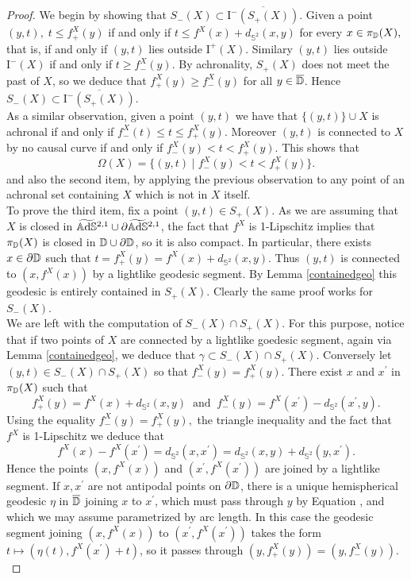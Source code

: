 \begin{proof}
    We begin by showing that $S_-(X)\subset \overline{\text{I}^-(S_+(X))}$. Given a point $(y,t),\;t\leq f_+^X(y)$ if and only if $t\leq f^X(x)+d_{\mathbb{S}^2}(x,y)$ for every $x\in\pi_{\mathbb{D}}(X),$ that is, if and only if $(y,t)$ lies outside $\text{I}^+(X)$. Similary $(y,t)$ lies outside $\text{I}^-(X)$ if and only if $t\geq f_-^X(y).$ By achronality, $S_+(X)$ does not meet the past of $X$, so we deduce that $f_+^X(y)\geq f_-^X(y)$ for all $y\in\overline{\mathbb{D}}$. Hence $S_-(X)\subset \overline{\text{I}^-(S_+(X))}$.\\
    As a similar observation, given a point $(y,t)$ we have that $\{(y,t)\}\cup X$ is achronal if and only if $f_-^X(t)\leq t\leq f_+^X(y)$. Moreover $(y,t)$ is connected to $X$ by no causal curve if and only if $f_-^X(y)<t<f_+^X(y)$. This shows that 
    \[
        \Omega(X)=\{(y,t)\;|\;f_-^X(y)<t<f_+^X(y)\}.
    \]
    and also the second item, by applying the previous observation to any point of an achronal set containing $X$ which is not in $X$ itself. \\
    To prove the third item, fix a point $(y,t)\in S_+(X)$. As we are assuming that $X$ is closed in $\widetilde{\mathbb{A}\mathrm{d}\mathbb{S}}{}^{2,1}\cup\partial\widetilde{\mathbb{A}\mathrm{d}\mathbb{S}}{}^{2,1}$, the fact that $f^X$ is 1-Lipschitz implies that $\pi_{\mathbb{D}}(X)$ is closed in $\mathbb{D}\cup\partial\mathbb{D}$, so it is also compact. In particular, there exists $x\in\partial\mathbb{D}$ such that $t=f_+^X(y)=f^X(x)+d_{\mathbb{S}^2}(x,y)$. Thus $(y,t)$ is connected to $(x,f^X(x))$ by a lightlike geodesic segment. By Lemma \ref{containedgeo} this geodesic is entirely contained in $S_+(X)$. Clearly the same proof works for $S_-(X)$. \\
    We are left with the computation of $S_-(X)\cap S_+(X)$. For this purpose, notice that if two points of $X$ are connected by a lightlike goedesic segment, again via Lemma \ref{containedgeo}, we deduce that $\gamma\subset S_-(X)\cap S_+(X).$ Conversely let $(y,t)\in S_-(X)\cap S_+(X)$ so that $f_-^X(y)=f_+^X(y).$ There exist $x$ and $x^{\prime}$ in $\pi_{\mathbb{D}}(X)$ such that 
    \[
        f_+^X(y)=f^{X}(x)+d_{\mathbb{S}^2}(x,y) \;\;\text{and}\;\;f_-^X(y)=f^X(x^{\prime})-d_{\mathbb{S}^2}(x^{\prime},y). 
    \]
    Using the equality $f_-^X(y)=f_+^X(y),$ the triangle inequality and the fact that $f^X$ is 1-Lipschitz we deduce that 
    \begin{equation}\label{42}
        f^{X}(x)-f^X(x^{\prime})=d_{\mathbb{S}^2}(x,x^{\prime})=d_{\mathbb{S}^2}(x,y)+d_{\mathbb{S}^2}(y,x^{\prime}). 
       \end{equation}
       Hence the points $(x,f^X(x))$ and $(x^{\prime},f^X(x^{\prime} ))$ are joined by a lightlike segment. If $x,x^{\prime}$ are not antipodal points on $\partial\mathbb{D}$, there is a unique hemispherical geodesic $\eta$ in $\overline{\mathbb{D}}$ joining $x$ to $x^{\prime}$, which must pass through $y$ by Equation , and which we may assume parametrized by arc length. In this case the geodesic segment joining $(x,f^X(x))$ to $(x^{\prime},f^X(x^{\prime} ))$ takes the form $t\mapsto(\eta(t),f^X(x^{\prime})+t)$, so it passes through $(y,f_+^X(y))=(y,f_-^X(y)).$\\

\end{proof}
